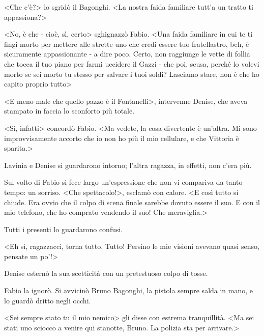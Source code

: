 <Che c'è?> lo sgridò il Bagonghi. <La nostra faida familiare tutt'a un tratto ti appassiona?>

<No, è che - cioè, sì, certo> sghignazzò Fabio. <Una faida familiare in cui te ti fingi morto per mettere alle strette uno che credi essere tuo fratellastro, beh, è sicuramente appassionante - a dire poco. Certo, non raggiunge le vette di follia che tocca il tuo piano per farmi uccidere il Gazzi - che poi, scusa, perché lo volevi morto se sei morto tu stesso per salvare i tuoi soldi? Lasciamo stare, non è che ho capito proprio tutto>

<E meno male che quello pazzo è il Fontanelli>, intervenne Denise, che aveva stampato in faccia lo sconforto più totale.

<Sì, infatti> concordò Fabio. <Ma vedete, la cosa divertente è un'altra. Mi sono improvvisamente accorto che io non ho più il mio cellulare, e che Vittoria è sparita.>

Lavinia e Denise si guardarono intorno; l'altra ragazza, in effetti, non c'era più.

Sul volto di Fabio si fece largo un'espressione che non vi compariva da tanto tempo: un sorriso. <Che spettacolo!>, esclamò con calore. <E così tutto si chiude. Era ovvio che il colpo di scena finale sarebbe dovuto essere il suo. E con il mio telefono, che ho comprato vendendo il suo! Che meraviglia.>

Tutti i presenti lo guardarono confusi.

<Eh sì, ragazzacci, torna tutto. Tutto! Persino le mie visioni avevano quasi senso, pensate un po'!>

Denise esternò la sua scetticità con un pretestuoso colpo di tosse.

Fabio la ignorò. Si avvicinò Bruno Bagonghi, la pistola sempre salda in mano, e lo guardò dritto negli occhi.

<Sei sempre stato tu il mio nemico> gli disse con estrema tranquillità. <Ma sei stati uno sciocco a venire qui stanotte, Bruno. La polizia sta per arrivare.>
